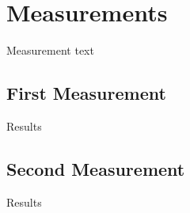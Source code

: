 \section{Measurements} \label{sec:measurements}
Measurement text

\subsection{First Measurement} \label{sec:measurements:first}
Results

\subsection{Second Measurement} \label{sec:measurements:second}
Results
